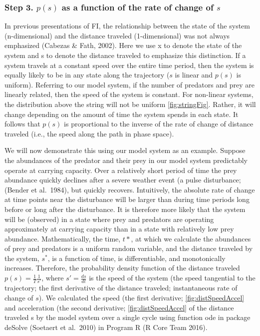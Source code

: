 \documentclass[12pt,twoside,openany]{reedthesis}
\begin{document}
\hypertarget{step-3.-ps-as-a-function-of-the-rate-of-change-of-s}{%
\subsubsection{\texorpdfstring{\textbf{Step 3.} \(p(s)\) as a function of the rate of change of \(s\)}{Step 3. p(s) as a function of the rate of change of s}}\label{step-3.-ps-as-a-function-of-the-rate-of-change-of-s}}

In previous presentations of FI, the relationship between the state of the system (n-dimensional) and the distance traveled (1-dimensional) was not always emphasized (Cabezas \& Fath, 2002). Here we use x to denote the state of the system and s to denote the distance traveled to emphasize this distinction. If a system travels at a constant speed over the entire time period, then the system is equally likely to be in any state along the trajectory (\(s\) is linear and \(p(s)\) is uniform). Referring to our model system, if the number of predators and prey are linearly related, then the speed of the system is constant. For non-linear systems, the distribution above the string will not be uniform \ref{fig:stringFig}. Rather, it will change depending on the amount of time the system spends in each state. It follows that \(p(s)\) is proportional to the inverse of the rate of change of distance traveled (i.e., the speed along the path in phase space).

We will now demonstrate this using our model system as an example. Suppose the abundances of the predator and their prey in our model system predictably operate at carrying capacity. Over a relatively short period of time the prey abundance quickly declines after a severe weather event (a pulse disturbance; (Bender et al.~1984), but quickly recovers. Intuitively, the absolute rate of change at time points near the disturbance will be larger than during time periods long before or long after the disturbance. It is therefore more likely that the system will be (observed) in a state where prey and predators are operating approximately at carrying capacity than in a state with relatively low prey abundance. Mathematically, the time, \(t*\), at which we calculate the abundances of prey and predators is a uniform random variable, and the distance traveled by the system, \(s^*\), is a function of time, is differentiable, and monotonically increases. Therefore, the probability density function of the distance traveled \(p(s)=\frac{1}{T}\frac{1}{s'}\), where \(s'= \frac{ds}{dt}\) is the speed of the system (the speed tangential to the trajectory; the first derivative of the distance traveled; instantaneous rate of change of \(s\)). We calculated the speed (the first derivative; \ref{fig:distSpeedAccel} and acceleration (the second derivative; \ref{fig:distSpeedAccel} of the distance traveled s by the model system over a single cycle using function ode in package deSolve (Soetaert et al.~2010) in Program R (R Core Team 2016).
\end{document}
